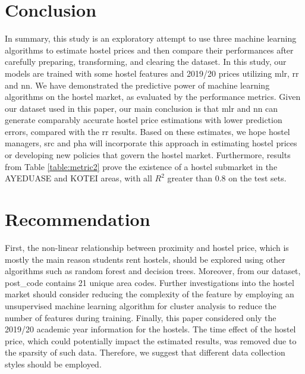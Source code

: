 
\begin{sloppypar}
		
	\section{Conclusion}
	In summary, this study is an exploratory attempt to use three machine learning algorithms to estimate hostel prices and then compare their performances after carefully preparing, transforming, and clearing the dataset. In this study, our models are trained with some hostel features and 2019/20 prices utilizing \ac{mlr}, \ac{rr} and \ac{nn}. We have demonstrated the predictive power of machine learning algorithms on the hostel market, as evaluated by the performance metrics. \newline
	Given our dataset used in this paper, our main conclusion is that \ac{mlr} and \ac{nn} can generate comparably accurate hostel price estimations with lower prediction errors, compared with the \ac{rr} results. Based on these estimates, we hope hostel managers, \ac{src} and \ac{pha} will incorporate this approach in estimating hostel prices or developing new policies that govern the hostel market. \newline
	Furthermore, results from Table \ref{table:metric2} prove the existence of a hostel submarket in the AYEDUASE and KOTEI areas, with all $ R^2 $ greater than 0.8 on the test sets.
		
		
	\section{Recommendation}
	First, the non-linear relationship between proximity and hostel price, which is mostly the main reason students rent hostels, should be explored using other algorithms such as random forest and decision trees. \newline
	Moreover, from our dataset, post\_code contains 21 unique area codes. Further investigations into the hostel market should consider reducing the complexity of the feature by employing an unsupervised machine learning algorithm for cluster analysis to reduce the number of features during training. \newline
	Finally, this paper considered only the 2019/20 academic year information for the hostels. The time effect of the hostel price, which could potentially impact the estimated results, was removed due to the sparsity of such data. Therefore, we suggest that different data collection styles should be employed.
		
\end{sloppypar}

